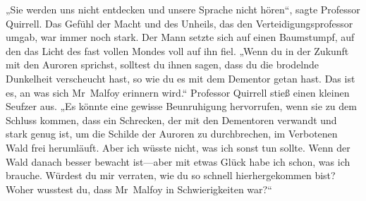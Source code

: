 „Sie werden uns nicht entdecken und unsere Sprache nicht hören“, sagte Professor Quirrell. Das Gefühl der Macht und des Unheils, das den Verteidigungsprofessor umgab, war immer noch stark. Der Mann setzte sich auf einen Baumstumpf, auf den das Licht des fast vollen Mondes voll auf ihn fiel. „Wenn du in der Zukunft mit den Auroren sprichst, solltest du ihnen sagen, dass du die brodelnde Dunkelheit verscheucht hast, so wie du es mit dem Dementor getan hast. Das ist es, an was sich Mr~Malfoy erinnern wird.“ Professor Quirrell stieß einen kleinen Seufzer aus. „Es könnte eine gewisse Beunruhigung hervorrufen, wenn sie zu dem Schluss kommen, dass ein Schrecken, der mit den Dementoren verwandt und stark genug ist, um die Schilde der Auroren zu durchbrechen, im Verbotenen Wald frei herumläuft. Aber ich wüsste nicht, was ich sonst tun sollte. Wenn der Wald danach besser bewacht ist—aber mit etwas Glück habe ich schon, was ich brauche. Würdest du mir verraten, wie du so schnell hierhergekommen bist? Woher wusstest du, dass Mr~Malfoy in Schwierigkeiten war?“

